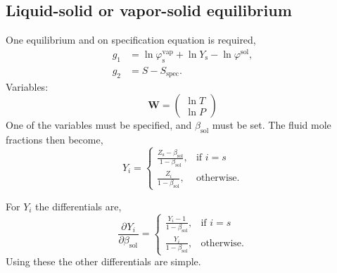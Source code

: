 \documentclass[internal,english]{sintefmemo2012}
\newcommand*{\pd}[3][]{\frac{\partial^{#1}#2}{\partial{#3}^{#1}}}%
\newcommand*{\vektor}[1]{\boldsymbol{#1}}%
\newcommand{\spec}{\text{spec}}
\newcommand{\sol}{\text{sol}}
\newcommand{\vap}{\text{vap}}
\newcommand{\scomp}{\text{s}\xspace}
\begin{document}
\subsection{Liquid-solid or vapor-solid equilibrium}
One equilibrium and on specification equation is required,
\begin{align}
   g_{1} &= \ln \varphi^\vap_\scomp + \ln Y_\scomp - \ln \varphi^\sol,\\
   g_{2} &= S - S_\spec \label{eq:spec_eq_ls}.
\end{align}
Variables:
\begin{equation}
  \label{eq:W_ls}
  \vektor{W} = \begin{pmatrix}
    \ln T \\
    \ln P
  \end{pmatrix}
\end{equation}
One of the variables must be specified, and $\beta_\sol$ must be set. The fluid mole fractions then become,
\begin{equation}
  Y_i = \begin{cases}
    \frac{Z_\scomp - \beta_\sol}{1-\beta_\sol}, & \text{if } i = s\\
    \frac{Z_i}{1-\beta_\sol}, & \text{otherwise}.
  \end{cases}
\end{equation}

For $Y_i$ the differentials are,
\begin{equation}
  \pd{Y_i}{\beta_\sol} = \begin{cases}
    \frac{Y_i - 1}{1-\beta_\sol}, & \text{if } i = s\\
    \frac{Y_i}{1-\beta_\sol}, & \text{otherwise}.
  \end{cases}
\end{equation}
Using these the other differentials are simple.
\end{document}
